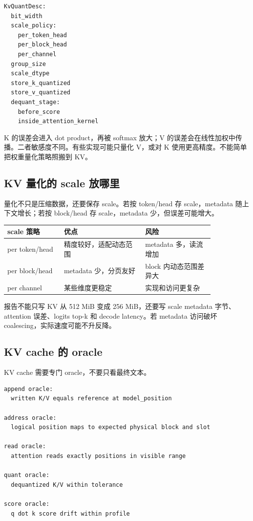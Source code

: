 \begin{lstlisting}[numbers=none,caption={KV 量化 descriptor}]
KvQuantDesc:
  bit_width
  scale_policy:
    per_token_head
    per_block_head
    per_channel
  group_size
  scale_dtype
  store_k_quantized
  store_v_quantized
  dequant_stage:
    before_score
    inside_attention_kernel
\end{lstlisting}

K 的误差会进入 dot product，再被 softmax 放大；V 的误差会在线性加权中传播。二者敏感度不同。有些实现可能只量化 V，或对 K 使用更高精度。不能简单把权重量化策略照搬到 KV。

\subsection{KV 量化的 scale 放哪里}

量化不只是压缩数据，还要保存 scale。若按 token/head 存 scale，metadata 随上下文增长；若按 block/head 存 scale，metadata 少，但误差可能增大。

\begin{center}
\begin{tabular}{p{0.23\linewidth}p{0.33\linewidth}p{0.28\linewidth}}
\toprule
scale 策略 & 优点 & 风险 \\
\midrule
per token/head & 精度较好，适配动态范围 & metadata 多，读流增加 \\
per block/head & metadata 少，分页友好 & block 内动态范围差异大 \\
per channel & 某些维度更稳定 & 实现和访问更复杂 \\
\bottomrule
\end{tabular}
\end{center}

报告不能只写 KV 从 512 MiB 变成 256 MiB，还要写 scale metadata 字节、attention 误差、logits top-k 和 decode latency。若 metadata 访问破坏 coalescing，实际速度可能不升反降。

\subsection{KV cache 的 oracle}

KV cache 需要专门 oracle，不要只看最终文本。

\begin{lstlisting}[numbers=none,caption={KV oracle 层次}]
append oracle:
  written K/V equals reference at model_position

address oracle:
  logical position maps to expected physical block and slot

read oracle:
  attention reads exactly positions in visible range

quant oracle:
  dequantized K/V within tolerance

score oracle:
  q dot k score drift within profile
\end{lstlisting}

